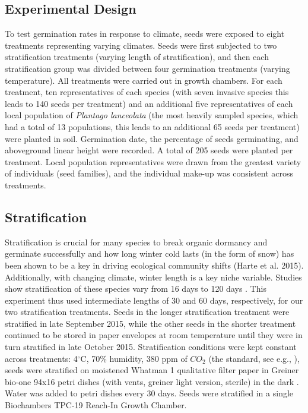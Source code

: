 \documentclass[12pt]{article}\usepackage[]{graphicx}\usepackage[]{color}
\begin{document}
	\subsection{Experimental Design}
	To test germination rates in response to climate, seeds were exposed to eight treatments representing varying climates. Seeds were first subjected to two stratification treatments (varying length of stratification), and then each stratification group was divided between four germination treatments (varying temperature). All treatments were carried out in growth chambers. For each treatment, ten representatives of each species (with seven invasive species this leads to 140 seeds per treatment) and an additional five representatives of each local population of \textit{Plantago lanceolata} (the most heavily sampled species, which had a total of 13 populations, this leads to an additional 65 seeds per treatment) were planted in soil. Germination date, the percentage of seeds germinating, and aboveground linear height were recorded.  A total of 205 seeds were planted per treatment.  Local population representatives were drawn from the greatest variety of individuals (seed families), and the individual make-up was consistent across treatments. 
	
	\subsection{Stratification}
	Stratification is crucial for many species to break organic dormancy and germinate successfully \parencite{Baskin1998,Popay1970,Wulff1994} and how long winter cold lasts (in the form of snow) has been shown to be a key in driving ecological community shifts (Harte et al. 2015). Additionally, with changing climate, winter length is a key niche variable. Studies show stratification of these species vary from 16 days \parencite{Popay1970} to 120 days \parencite{Meekins1999}. This experiment thus used intermediate lengths of 30 and 60 days, respectively, for our two stratification treatments. Seeds in the longer stratification treatment were stratified in late September 2015, while the other seeds in the shorter treatment continued to be stored in paper envelopes at room temperature until they were in turn stratified in late October 2015. Stratification conditions were kept constant across treatments:  4$^\circ$C, 70\% humidity, 380 ppm of $CO_2$ (the standard, see e.g., \textcite{Meekins1999,Popay1970}), seeds were stratified on moistened Whatman 1 qualitative filter paper in Greiner bio-one 94x16 petri dishes (with vents, greiner light version, sterile) in the dark \parencite{Baskin1998,Popay1970}.  Water was added to petri dishes every 30 days. Seeds were stratified in a single Biochambers TPC-19 Reach-In Growth Chamber. 
	
\end{document}
